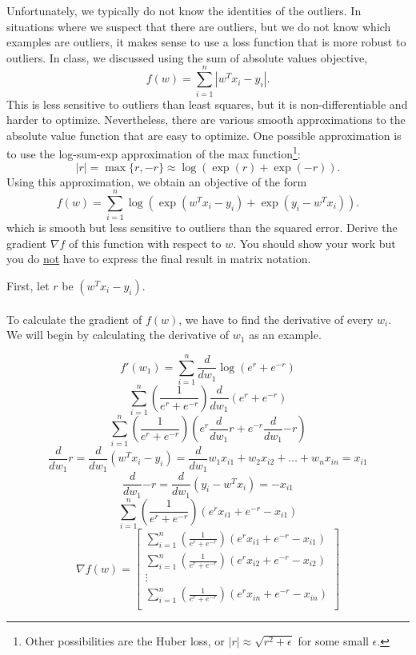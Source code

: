 \documentclass{article}
\def\blu#1{{\color{blu}#1}}
\begin{document}
Unfortunately, we typically do not know the identities of the outliers. In situations where we suspect that there are outliers, but we do not know which examples are outliers, it makes sense to use a loss function that is more robust to outliers. In class, we discussed using the sum of absolute values objective,
\[
f(w) = \sum_{i=1}^n |w^Tx_i - y_i|.
\]
This is less sensitive to outliers than least squares, but it is non-differentiable and harder to optimize. Nevertheless, there are various smooth approximations to the absolute value function that are easy to optimize. One possible approximation is to use the log-sum-exp approximation of the max function\footnote{Other possibilities are the Huber loss, or $|r|\approx \sqrt{r^2+\epsilon}$ for some small $\epsilon$.}:
\[
|r| = \max\{r, -r\} \approx \log(\exp(r) + \exp(-r)).
\]
Using this approximation, we obtain an objective of the form
\[
f(w) {=} \sum_{i=1}^n  \log\left(\exp(w^Tx_i - y_i) + \exp(y_i - w^Tx_i)\right).
\]
which is smooth but less sensitive to outliers than the squared error. \blu{Derive
 the gradient $\nabla f$ of this function with respect to $w$. You should show your work but you do \underline{not} have to express the final result in matrix notation.}

First, let $r$ be $(w^Tx_i - y_i)$. \\\\
To calculate the gradient of $f(w)$, we have to find the derivative of every $w_i$. We will begin by calculating the derivative of $w_1$ as an example.

$$f'(w_1) {=} \sum_{i=1}^n  \frac{d}{dw_1} \log\left(e^{r} + e^{-r}\right)$$
$$\sum_{i=1}^n (\frac{1}{e^r + e^{-r}})\frac{d}{dw_1}(e^r + e^{-r})$$
$$\sum_{i=1}^n  (\frac{1}{e^r + e^{-r}})(e^r\frac{d}{dw_1}r + e^{-r}\frac{d}{dw_1}{-r})$$
$$\frac{d}{dw_1}r = \frac{d}{dw_1}(w^Tx_i - y_i) = \frac{d}{dw_1}w_1x_{i1} + w_2x_{i2} + \ldots + w_nx_{in} = x_{i1}$$
$$\frac{d}{dw_1}{-r} = \frac{d}{dw_1}(y_i - w^Tx_i) = -x_{i1}$$
$$\sum_{i=1}^n  (\frac{1}{e^r + e^{-r}})(e^rx_{i1} + e^{-r}-x_{i1})$$
$$\nabla f(w) =
\begin{bmatrix}
	\sum_{i=1}^n  (\frac{1}{e^r + e^{-r}})(e^rx_{i1} + e^{-r}-x_{i1}) \\
	\sum_{i=1}^n  (\frac{1}{e^r + e^{-r}})(e^rx_{i2} + e^{-r}-x_{i2}) \\
	\vdots \\
	\sum_{i=1}^n  (\frac{1}{e^r + e^{-r}})(e^rx_{in} + e^{-r}-x_{in}) \\
\end{bmatrix}$$
\end{document}
